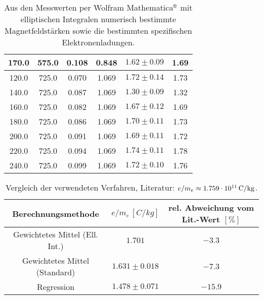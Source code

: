 \begin{table}[htb]
\begin{tabular}{|c|c|c|c|c|c|}
\hline
170.0 & 575.0 & 0.108 & 0.848 & $1.62 \pm 0.09$ & 1.69 \\
\hline
120.0 & 725.0 & 0.070 & 1.069 & $1.72 \pm 0.14$ & 1.73 \\
\hline
140.0 & 725.0 & 0.087 & 1.069 & $1.30 \pm 0.09$ & 1.32 \\
\hline
160.0 & 725.0 & 0.082 & 1.069 & $1.67 \pm 0.12$ & 1.69 \\
\hline
180.0 & 725.0 & 0.086 & 1.069 & $1.70 \pm 0.11$ & 1.73 \\
\hline
200.0 & 725.0 & 0.091 & 1.069 & $1.69 \pm 0.11$ & 1.72 \\
\hline
220.0 & 725.0 & 0.094 & 1.069 & $1.74 \pm 0.11$ & 1.78 \\
\hline
240.0 & 725.0 & 0.099 & 1.069 & $1.72 \pm 0.10$ & 1.76 \\
\hline
\end{tabular}
\caption{Aus den Messwerten per Wolfram Mathematica$^\text{\textregistered}$ mit elliptischen Integralen numerisch bestimmte Magnetfeldstärken sowie die bestimmten spezifischen Elektronenladungen.}
\label{tab:Feldstaerke}
\end{table}
\begin{table}[htb]
\centering
\begin{tabular}{|c|c|c|}
  \hline
  Berechnungsmethode & $e/m_e\,[\unit{C/kg}]$ & rel. Abweichung vom Lit.-Wert $[\%]$\\
  \hline
  Gewichtetes Mittel (Ell. Int.) & $1.701$ & $-3.3$ \\
  \hline
  Gewichtetes Mittel (Standard) & $1.631 \pm 0.018$ & $-7.3$\\
  \hline
  Regression & $1.478 \pm 0.071$ & $-15.9$ \\
  \hline
\end{tabular}
\caption{Vergleich der verwendeten Verfahren, Literatur: $e/m_e \approx \unit[1.759\cdot10^{11}]{C/kg}$.}
\label{tab:Vergleich}
\end{table}
